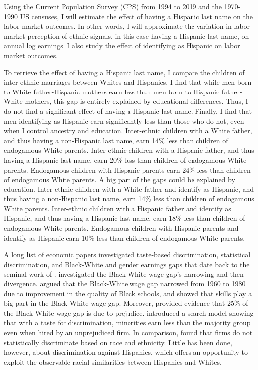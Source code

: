 \documentclass[12pt, fullpage]{article}
\begin{document}
Using the Current Population Survey (CPS) from 1994 to 2019 and the 1970-1990 US censuses, I will estimate the effect of having a Hispanic last name on the labor market outcomes. In other words, I will approximate the variation in labor market perception of ethnic signals, in this case having a Hispanic last name, on annual log earnings. I also study the effect of identifying as Hispanic on labor market outcomes. 

To retrieve the effect of having a Hispanic last name, I compare the children of inter-ethnic marriages between Whites and Hispanics. I find that while men born to White father-Hispanic mothers earn less than men born to Hispanic father-White mothers, this gap is entirely explained by educational differences. Thus, I do not find a significant effect of having a Hispanic last name. Finally, I find that men identifying as Hispanic earn significantly less than those who do not, even when I control ancestry and education. Inter-ethnic children with a White father, and thus having a non-Hispanic last name, earn 14\% less than children of endogamous White parents. Inter-ethnic children with a Hispanic father, and thus having a Hispanic last name, earn 20\% less than children of endogamous White parents. Endogamous children with Hispanic parents earn 24\% less than children of endogamous White parents. A big part of the gaps could be explained by education. Inter-ethnic children with a White father and identify as Hispanic, and thus having a non-Hispanic last name, earn 14\% less than children of endogamous White parents. Inter-ethnic children with a Hispanic father and identify as Hispanic, and thus having a Hispanic last name, earn 18\% less than children of endogamous White parents. Endogamous children with Hispanic parents and identify as Hispanic earn 10\% less than children of endogamous White parents.

A long list of economic papers investigated taste-based discrimination, statistical discrimination, and Black-White and gender earnings gaps that date back to the seminal work of \citet{becker2010economics}. \citet{bayer2018divergent} investigated the Black-White wage gap's narrowing and then divergence. \citet{card1992school} argued that the Black-White wage gap narrowed from 1960 to 1980 due to improvement in the quality of Black schools, and \citet{juhn1991accounting} showed that skills play a big part in the Black-White wage gap. Moreover,  \citet{charles2008prejudice} provided evidence that 25\% of the Black-White wage gap is due to prejudice. \citet{black1995discrimination} introduced a search model showing that with a taste for discrimination, minorities earn less than the majority group even when hired by an unprejudiced firm. In comparison, \citet{altonji2001employer} found that firms do not statistically discriminate based on race and ethnicity. Little has been done, however, about discrimination against Hispanics, which offers an opportunity to exploit the observable racial similarities between Hispanics and Whites.
\end{document}
